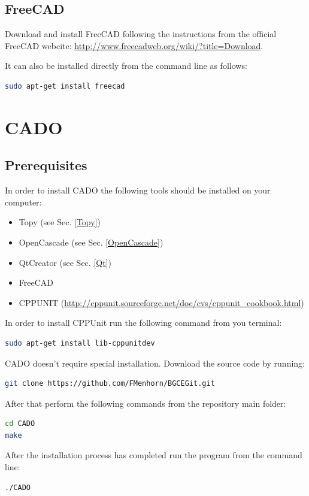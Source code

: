\documentclass[11pt,a4paper,article,bibtotoc,idxtotoc,headsepline,footsepline,footexclude,DIV13,oneside]{scrbook}
\begin{document}
\section{FreeCAD}
Download and install FreeCAD following the instructions from the official FreeCAD webcite: \href{http://www.freecadweb.org/wiki/?title=Download}{http://www.freecadweb.org/wiki/?title=Download}.

It can also be installed directly from the command line as follows:
\begin{lstlisting}[language=bash]
sudo apt-get install freecad
\end{lstlisting}
\chapter{CADO}
\section{Prerequisites}
In order to install CADO the following tools should be installed on your computer:
\begin{itemize}
	\item Topy (see Sec. \ref{Topy})
	\item OpenCascade (see Sec. \ref{OpenCascade})
	\item QtCreator (see Sec. \ref{Qt})
	\item FreeCAD
	\item CPPUNIT (\href{http://cppunit.sourceforge.net/doc/cvs/cppunit_cookbook.html}{http://cppunit.sourceforge.net/doc/cvs/cppunit\_cookbook.html})
	\end{itemize}
In order to install CPPUnit run the following command from you terminal:
\begin{lstlisting}[language=bash]
sudo apt-get install lib-cppunitdev
\end{lstlisting}
CADO doesn't require special installation. Download the source code by running:
\begin{lstlisting}[language=bash]
git clone https://github.com/FMenhorn/BGCEGit.git
\end{lstlisting}	
After that perform the following commands from the repository main folder:
\begin{lstlisting}[language=bash]
cd CADO
make
\end{lstlisting}	
After the installation process has completed run the program from the command line:
\begin{lstlisting}[language=bash]
./CADO
\end{lstlisting}	


  	\clearemptydoublepage
	
 
\end{document}
